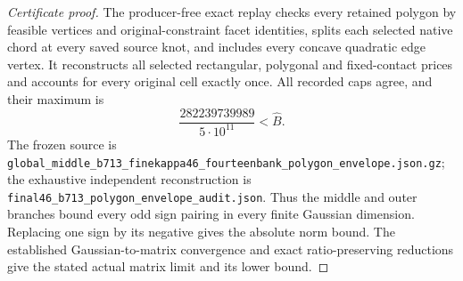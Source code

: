 \documentclass{article}
\begin{document}
\begin{proof}[Certificate proof]
The producer-free exact replay checks every retained polygon by feasible
vertices and original-constraint facet identities, splits each selected
native chord at every saved source knot, and includes every concave
quadratic edge vertex. It reconstructs all selected rectangular,
polygonal and fixed-contact prices and accounts for every original cell
exactly once. All recorded caps agree, and their maximum is
\[
 \frac{282239739989}{5\cdot10^{11}}<\widehat B.
\]
The frozen source is
\texttt{global\_\allowbreak middle\_\allowbreak b713\_\allowbreak finekappa46\_\allowbreak fourteenbank\_\allowbreak polygon\_\allowbreak envelope.json.gz};
the exhaustive independent reconstruction is
\texttt{final46\_\allowbreak b713\_\allowbreak polygon\_\allowbreak envelope\_\allowbreak audit.json}.
Thus the middle and outer branches bound every odd sign pairing in
every finite Gaussian dimension. Replacing one sign by its negative
gives the absolute norm bound. The established Gaussian-to-matrix
convergence and exact ratio-preserving reductions give the stated
actual matrix limit and its lower bound.
\end{proof}
\end{document}
